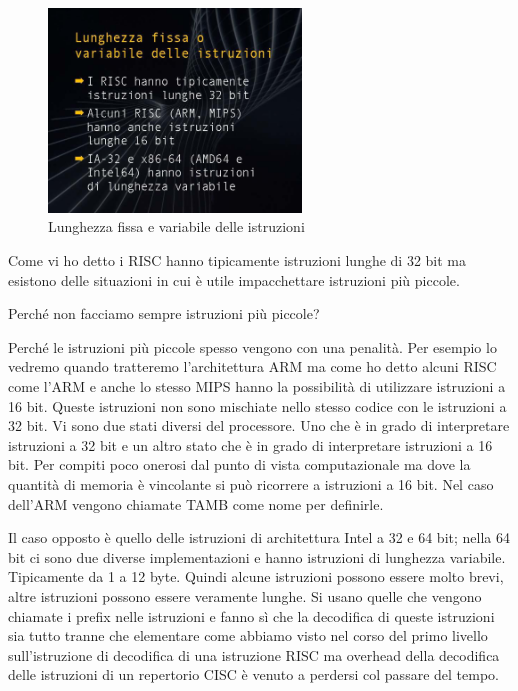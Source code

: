 \FloatBarrier
\begin{figure}[H]
  \centering
  \includegraphics[width=0.6\textwidth,
                    trim=40 40 15 40, %
                    clip]{images/Lez02_p04_fig_02.png}
  \caption{Lunghezza fissa e variabile delle istruzioni}
  \label{fig:Lez02_p04_fig_02}
\end{figure}
\FloatBarrier
\noindent

Come vi ho detto i RISC hanno tipicamente istruzioni lunghe di 32 bit ma esistono delle situazioni in cui è utile impacchettare istruzioni più piccole.

Perché non facciamo sempre istruzioni più piccole?

Perché le istruzioni più piccole spesso vengono con una penalità.
Per esempio lo vedremo quando tratteremo l'architettura ARM ma come ho detto alcuni RISC come l'ARM e anche lo stesso MIPS hanno la possibilità di utilizzare istruzioni a 16 bit.
Queste istruzioni non sono mischiate nello stesso codice con le istruzioni a 32 bit. Vi sono due stati diversi del processore.
Uno che è in grado di interpretare istruzioni a 32 bit e un altro stato che è in grado di interpretare istruzioni a 16 bit.
Per compiti poco onerosi dal punto di vista computazionale ma dove la quantità di memoria è vincolante si può ricorrere a istruzioni a 16 bit.
Nel caso dell'ARM vengono chiamate TAMB come nome per definirle.

Il caso opposto è quello delle istruzioni di architettura Intel a 32 e 64 bit; nella 64 bit ci sono due diverse implementazioni e hanno istruzioni di lunghezza variabile.
Tipicamente da 1 a 12 byte.
Quindi alcune istruzioni possono essere molto brevi, altre istruzioni possono essere veramente lunghe.
Si usano quelle che vengono chiamate i prefix nelle istruzioni e fanno sì che la decodifica di queste istruzioni sia tutto tranne che elementare come abbiamo visto nel corso del primo livello sull'istruzione di decodifica di una istruzione RISC ma overhead della decodifica delle istruzioni di un repertorio CISC è venuto a perdersi col passare del tempo.


